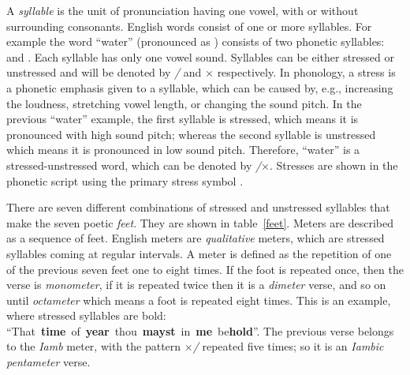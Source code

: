 A \textit{syllable} is the unit of pronunciation having one vowel, with or without surrounding
consonants. English words consist of one or more syllables. For example the word \mbox{``water''}
(pronounced as \mbox{}) consists of two phonetic syllables:
\mbox{} and \mbox{}. Each syllable has only one
vowel sound. Syllables can be either stressed or unstressed and will be denoted by \textit{/} and
$\times$ respectively. In phonology, a stress is a phonetic emphasis given to a syllable, which can
be caused by, e.g., increasing the loudness, stretching vowel length, or changing the sound
pitch. In the previous ``water'' example, the first syllable is stressed, which means it is
pronounced with high sound pitch; whereas the second syllable is unstressed which means it is
pronounced in low sound pitch. Therefore, ``water'' is a stressed-unstressed word, which can be
denoted by \mbox{\textit{/}$\times$}. Stresses are shown in the phonetic script using the primary stress
symbol .
\begin{table}[!tb]
  \centering
  \caption{The seven feet of English poem. Every foot is a combination of stressed and unstressed
    syllables, denoted by \textit{/} and \textit{x} respectively.}\label{feet}
\end{table}
There are seven different combinations of stressed and unstressed syllables that make the seven
poetic \textit{feet}.  They are shown in table~\ref{feet}. Meters are described as a sequence of
feet. English meters are \textit{qualitative} meters, which are stressed syllables coming at regular
intervals. A meter is defined as the repetition of one of the previous seven feet one to eight
times. If the foot is repeated once, then the verse is \textit{monometer}, if it is repeated twice
then it is a \textit{dimeter} verse, and so on until \textit{octameter} which means a foot is
repeated eight times. This is an example, where stressed syllables are bold: \mbox{``That
  \textbf{time} of \textbf{year} thou \textbf{mayst} in \textbf{me} be\textbf{hold}''}. The previous
verse belongs to the \textit{Iamb} meter, with the pattern \mbox{$\times$\textit{/}} repeated five times;
so it is an \textit{Iambic pentameter} verse.


